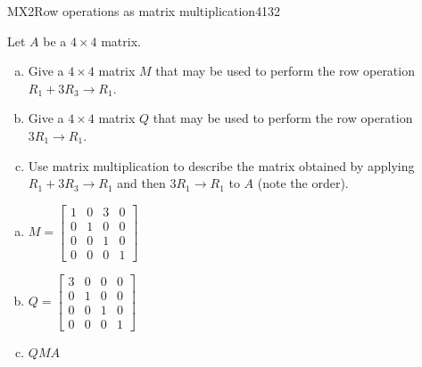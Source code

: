 \begin{exercise}{MX2}{Row operations as matrix multiplication}{4132} 
\begin{exerciseStatement} 

Let \(A\) be a \(4 \times 4\) matrix.

 

\begin{enumerate}[(a)]
\item Give a \(4 \times 4\) matrix \(M\) that may be used to perform the row operation \(R_1 + 3 R_3 \to R_1\).
\item Give a \(4 \times 4\) matrix \(Q\) that may be used to perform the row operation \(3 R_1 \to R_1\).
\item Use matrix multiplication to describe the matrix obtained by applying \(R_1 + 3 R_3 \to R_1\) and then \(3 R_1 \to R_1\) to \(A\) (note the order). 
\end{enumerate}

     \end{exerciseStatement}
 \begin{exerciseAnswer} 

\begin{enumerate}[(a)]
\item \(M=\left[\begin{array}{cccc}
1 & 0 & 3 & 0 \\
0 & 1 & 0 & 0 \\
0 & 0 & 1 & 0 \\
0 & 0 & 0 & 1
\end{array}\right]\)
\item \(Q=\left[\begin{array}{cccc}
3 & 0 & 0 & 0 \\
0 & 1 & 0 & 0 \\
0 & 0 & 1 & 0 \\
0 & 0 & 0 & 1
\end{array}\right]\)
\item  \(QMA\) 
\end{enumerate}

     \end{exerciseAnswer}
 \end{exercise}



